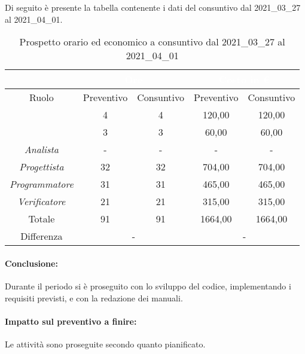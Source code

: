 Di seguito è presente la tabella contenente i dati del consuntivo dal 2021\_03\_27 al 2021\_04\_01.
\begin{table}[H]
	\centering
	\begin{tabular}{|c|c|c|c|c|}
		\rowcolor{darkblue} 
		&\multicolumn{2}{c|}{\textcolor{white}{Ore}}&\multicolumn{2}{c|}{\textcolor{white}{Costo in €}}\\ \hline
		Ruolo			&	Preventivo				&	Consuntivo		&	Preventivo	&	Consuntivo\\ \hline
		{\Responsabile}		&	4					&	4				&	120,00			&	120,00 \\ \hline
		{\Amministratore}	&	3					&	3				&	60,00			&	60,00 \\ \hline
		\textit{Analista}	&	-					&	-				&	-			&	- \\ \hline
		\textit{Progettista}& 	32					&   32 				& 	704,00			&  	704,00 \\ \hline
		\textit{Programmatore}& 31					& 	31				& 	465,00			&  	465,00 \\ \hline
		\textit{Verificatore}&	21					&	21				&	315,00			&	315,00 \\ \hline
		Totale				&	91					&	91				&	1664,00			&	1664,00 \\ \hline
		Differenza			& 	\multicolumn{2}{c|}{-} 				&\multicolumn{2}{c|}{-}\\ \hline
	\end{tabular}
	\caption{Prospetto orario ed economico a consuntivo dal 2021\_03\_27 al 2021\_04\_01}
\end{table}
\paragraph*{Conclusione:}
Durante il periodo si è proseguito con lo sviluppo del codice, implementando i requisiti previsti, e con la redazione dei manuali.
\paragraph*{Impatto sul preventivo a finire:}
Le attività sono proseguite secondo quanto pianificato.

